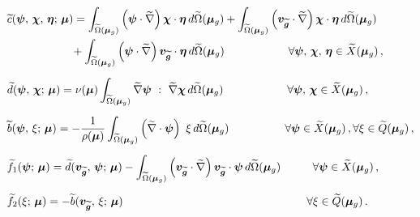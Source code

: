 \documentclass[12pt, a4paper, twoside, openright]{report}
\numberwithin{equation}{chapter}
\theoremstyle{theorem}
\theoremstyle{definition}
\theoremstyle{remark}
\theoremstyle{proposition}
\numberwithin{figure}{chapter}
\newcommand{\wt}[1]{\widetilde{#1}}
\newcommand{\bg}[1]{\boldsymbol{#1}}
\begin{document}
		\begin{subequations}
			\label{eq:ns-weak-forms}
			\begin{align}
				& \wt{c}(\bg{\psi}, \, \bg{\chi}, \, \bg{\eta}; \, \bg{\mu}) = \int_{\wt{\Omega}(\bg{\mu}_g)} \left( \bg{\psi} \cdot \wt{\nabla} \right) \bg{\chi} \cdot \bg{\eta} \, d\wt{\Omega}(\bg{\mu}_g) + \int_{\wt{\Omega}(\bg{\mu}_g)} \left( \bg{v}_{\wt{\bg{g}}} \cdot \wt{\nabla} \right) \bg{\chi} \cdot \bg{\eta} \, d\wt{\Omega} (\bg{\mu}_g) \notag \\
				\label{eq:ns-weak-forms-c}
				& \hspace*{2cm} + \int_{\wt{\Omega}(\bg{\mu}_g)} \left( \bg{\psi} \cdot \wt{\nabla} \right) \bg{v}_{\wt{\bg{g}}} \cdot \bg{\eta} \, d\wt{\Omega}(\bg{\mu}_g) \hspace*{2cm} \forall \bg{\psi}, \, \bg{\chi}, \, \bg{\eta} \in \wt{X}(\bg{\mu}_g) \, , \\[0.2cm]
				\label{eq:ns-weak-forms-d}
				& \wt{d}(\bg{\psi}, \, \bg{\chi}; \, \bg{\mu}) = \nu(\bg{\mu}) \int_{\wt{\Omega}(\bg{\mu}_g)} \wt{\nabla} \bg{\psi} ~ : ~ \wt{\nabla} \bg{\chi} \, d\wt{\Omega}(\bg{\mu}_g) \hspace*{2cm} \forall \bg{\psi}, \, \bg{\chi} \in \wt{X}(\bg{\mu}_g) \, , \\[0.2cm]
				\label{eq:ns-weak-forms-b}
				& \wt{b}(\bg{\psi}, \, \xi; \, \bg{\mu}) = - \dfrac{1}{\rho(\bg{\mu})} \int_{\wt{\Omega}(\bg{\mu}_g)} \left( \wt{\nabla} \cdot \bg{\psi} \right) ~ \xi \, d\wt{\Omega}(\bg{\mu}_g) \hspace*{1.75cm} \forall \bg{\psi} \in \wt{X}(\bg{\mu}_g) \, , \forall \xi \in \wt{Q}(\bg{\mu}_g) \, , \\[0.2cm]
				\label{eq:ns-weak-forms-f1}
				& \wt{f}_1(\bg{\psi}; \, \bg{\mu}) = \wt{d}(\bg{v}_{\wt{\bg{g}}}, \, \bg{\psi}; \, \bg{\mu})- \int_{\wt{\Omega}(\bg{\mu}_g)} \left( \bg{v}_{\wt{\bg{g}}} \cdot \wt{\nabla} \right) \bg{v}_{\wt{\bg{g}}} \cdot \bg{\psi} \, d\wt{\Omega}(\bg{\mu}_g) \hspace*{1cm} \forall \bg{\psi} \in \wt{X}(\bg{\mu}_g) \, , \\[0.2cm]
				\label{eq:ns-weak-forms-f2}
				& \wt{f}_2(\xi; \, \bg{\mu}) = - \wt{b}(\bg{v}_{\wt{\bg{g}}}, \, \xi; \, \bg{\mu}) \hspace*{5.75cm} \forall \xi \in \wt{Q}(\bg{\mu}_g) \, .
			\end{align}
		\end{subequations}
\end{document}
